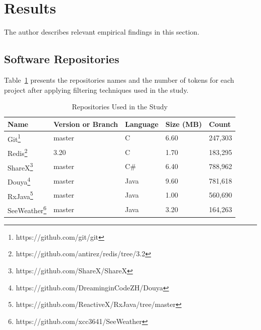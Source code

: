 \documentclass[conference]{IEEEtran}
\begin{document}
 
 

\section{Results}
\label{results}
The author describes relevant empirical findings in this section.   
\subsection{Software Repositories}
\label{res_proj_collect}
Table~\ref{table-repos} presents the repositories names and the number of tokens for each project after applying filtering techniques used in the study. 
\begin{table}[]
\centering
\caption{Repositories Used in the Study}
\label{table-repos}
\begin{tabular}{lllll}
\hline
Name &  Version or Branch & Language & Size (MB) & Count   \\
\hline
Git\footnote{https://github.com/git/git} & master & C & 6.60 & 247,303  \\
Redis\footnote{https://github.com/antirez/redis/tree/3.2} & 3.20 & C  & 1.70 & 183,295 \\
ShareX\footnote{https://github.com/ShareX/ShareX} & master & C\# &  6.40 & 788,962 \\
Douya\footnote{https://github.com/DreaminginCodeZH/Douya} & master & Java & 9.60  & 781,618 \\
RxJava\footnote{https://github.com/ReactiveX/RxJava/tree/master} & master & Java &  1.00 & 560,690 \\
SeeWeather\footnote{https://github.com/xcc3641/SeeWeather} & master & Java  &  3.20 & 164,263\\
\hline
\end{tabular}
\end{table}
\end{document}
